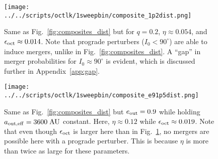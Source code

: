 \documentclass[
        fleqn,
        usenatbib,
    ]{mnras}
\newlength{\colummwidth}
\begin{document}
\begin{figure}
    \centering
    \texttt{[image: ../../scripts/octlk/1sweepbin/composite\_1p2dist.png]}
    \caption{Same as Fig.~\ref{fig:composites_dist} but for $q = 0.2$, $\eta
    \approx 0.054$, and $\epsilon_{\rm oct} \approx 0.014$. Note that prograde
    perturbers ($I_0 < 90^\circ$) are able to induce mergers, unlike in
    Fig.~\ref{fig:composites_dist}. A ``gap'' in merger probabilities for $I_0
    \approx 90^\circ$ is evident, which is discussed further in
    Appendix~\ref{app:gap}. }\label{fig:composites_1p2}
\end{figure}
\begin{figure}
    \centering
    \texttt{[image: ../../scripts/octlk/1sweepbin/composite\_e91p5dist.png]}
    \caption{Same as Fig.~\ref{fig:composites_dist} but $e_{\rm out} = 0.9$
    while holding $a_{\rm out, eff} = 3600\;\mathrm{AU}$ constant. Here, $\eta
    \approx 0.12$ while $\epsilon_{\rm oct} \approx 0.019$. Note that even
    though $\epsilon_{\rm oct}$ is larger here than in
    Fig.~\ref{fig:composites_1p2}, no mergers are possible here with a prograde
    perturber. This is because $\eta$ is more than twice as large for these
    parameters.
    }\label{fig:composites_e91p5}
\end{figure}
\end{document}
